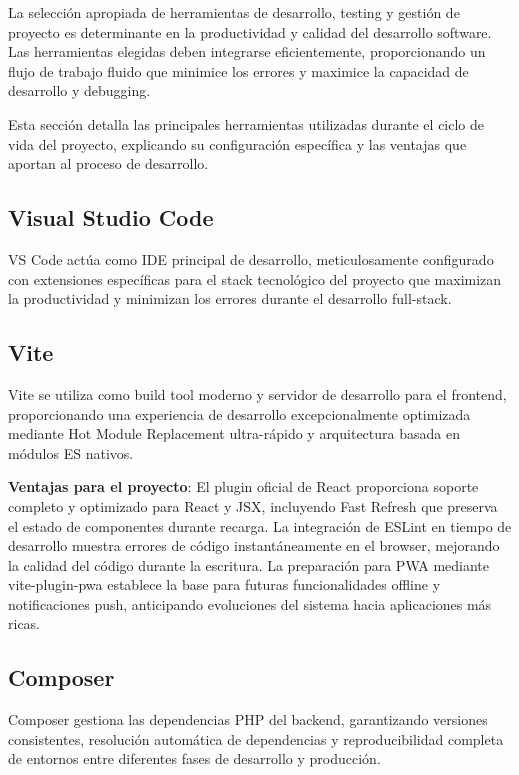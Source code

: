 \documentclass[12pt,a4paper,oneside]{report}
\begin{document}
La selección apropiada de herramientas de desarrollo, testing y gestión de proyecto es determinante en la productividad y calidad del desarrollo software. Las herramientas elegidas deben integrarse eficientemente, proporcionando un flujo de trabajo fluido que minimice los errores y maximice la capacidad de desarrollo y debugging.

Esta sección detalla las principales herramientas utilizadas durante el ciclo de vida del proyecto, explicando su configuración específica y las ventajas que aportan al proceso de desarrollo.

\subsection{Visual Studio Code}\label{visual-studio-code}

VS Code actúa como IDE principal de desarrollo, meticulosamente configurado con extensiones específicas para el stack tecnológico del proyecto que maximizan la productividad y minimizan los errores durante el desarrollo full-stack.

\subsection{Vite}\label{vite}

Vite se utiliza como build tool moderno y servidor de desarrollo para el frontend, proporcionando una experiencia de desarrollo excepcionalmente optimizada mediante Hot Module Replacement ultra-rápido y arquitectura basada en módulos ES nativos.

\textbf{Ventajas para el proyecto}: El plugin oficial de React proporciona soporte completo y optimizado para React y JSX, incluyendo Fast Refresh que preserva el estado de componentes durante recarga. La integración de ESLint en tiempo de desarrollo muestra errores de código instantáneamente en el browser, mejorando la calidad del código durante la escritura. La preparación para PWA mediante vite-plugin-pwa establece la base para futuras funcionalidades offline y notificaciones push, anticipando evoluciones del sistema hacia aplicaciones más ricas.

\subsection{Composer}\label{composer}

Composer gestiona las dependencias PHP del backend, garantizando versiones consistentes, resolución automática de dependencias y reproducibilidad completa de entornos entre diferentes fases de desarrollo y producción.
\end{document}
